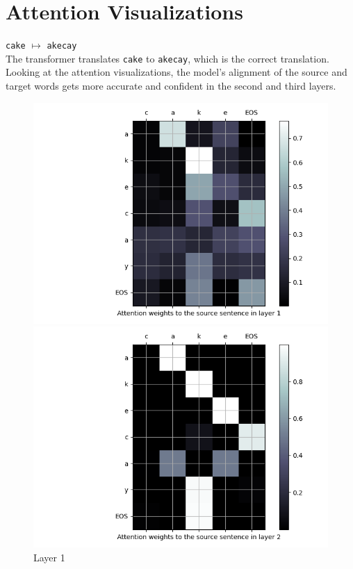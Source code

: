 \newpage
\section{Attention Visualizations}

\begin{enumarabic}
  \item \verb|cake| $\mapsto$ \verb|akecay| \\
    The transformer translates \verb|cake| to \verb|akecay|, which is the correct translation.
    Looking at the attention visualizations, the model's alignment of the source
    and target words gets more accurate and confident in the second and third layers.

    \begin{figure}[H]
      \centering
      \begin{minipage}[b]{0.33\textwidth}
        \centering
        \includegraphics[width=\textwidth]{figures/cake-0.png}
        \caption{Layer 1}
        \label{fig:cake-0}
      \end{minipage}
      \hfill
      \begin{minipage}[b]{0.33\textwidth}
        \centering
        \includegraphics[width=\textwidth]{figures/cake-1.png}

\end{minipage}
\end{figure}
\end{enumarabic}
